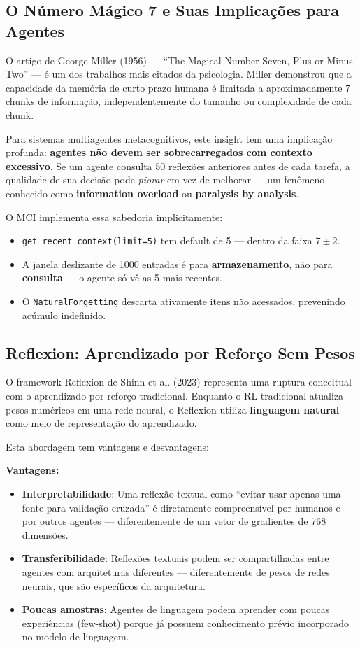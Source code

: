 \subsection{O Número Mágico 7 e Suas Implicações para Agentes}

O artigo de George Miller (1956) \cite{Miller1956_Magical7} — ``The Magical Number Seven, Plus or Minus Two'' — é um dos trabalhos mais citados da psicologia. Miller demonstrou que a capacidade da memória de curto prazo humana é limitada a aproximadamente 7 chunks de informação, independentemente do tamanho ou complexidade de cada chunk.

Para sistemas multiagentes metacognitivos, este insight tem uma implicação profunda: \textbf{agentes não devem ser sobrecarregados com contexto excessivo}. Se um agente consulta 50 reflexões anteriores antes de cada tarefa, a qualidade de sua decisão pode \textit{piorar} em vez de melhorar — um fenômeno conhecido como \textbf{information overload} ou \textbf{paralysis by analysis}.

O MCI implementa essa sabedoria implicitamente:

\begin{itemize}
    \item \texttt{get\_recent\_context(limit=5)} tem default de 5 — dentro da faixa $7 \pm 2$.
    \item A janela deslizante de 1000 entradas é para \textbf{armazenamento}, não para \textbf{consulta} — o agente só vê as 5 mais recentes.
    \item O \texttt{NaturalForgetting} descarta ativamente itens não acessados, prevenindo acúmulo indefinido.
\end{itemize}

\subsection{Reflexion: Aprendizado por Reforço Sem Pesos}

O framework Reflexion de Shinn et al. (2023) \cite{Shinn2023_Reflexion} representa uma ruptura conceitual com o aprendizado por reforço tradicional. Enquanto o RL tradicional atualiza pesos numéricos em uma rede neural, o Reflexion utiliza \textbf{linguagem natural} como meio de representação do aprendizado.

Esta abordagem tem vantagens e desvantagens:

\textbf{Vantagens:}
\begin{itemize}
    \item \textbf{Interpretabilidade}: Uma reflexão textual como ``evitar usar apenas uma fonte para validação cruzada'' é diretamente compreensível por humanos e por outros agentes — diferentemente de um vetor de gradientes de 768 dimensões.
    \item \textbf{Transferibilidade}: Reflexões textuais podem ser compartilhadas entre agentes com arquiteturas diferentes — diferentemente de pesos de redes neurais, que são específicos da arquitetura.
    \item \textbf{Poucas amostras}: Agentes de linguagem podem aprender com poucas experiências (few-shot) porque já possuem conhecimento prévio incorporado no modelo de linguagem.
\end{itemize}

